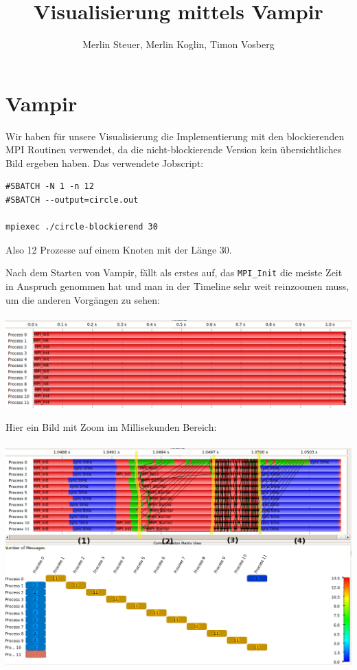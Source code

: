 \documentclass[11pt]{article} %
\title{Visualisierung mittels Vampir}
\author{Merlin Steuer, Merlin Koglin, Timon Vosberg}
\date{} %
\begin{document}
\maketitle
\section{Vampir}
Wir haben für unsere Visualisierung die Implementierung mit den blockierenden MPI Routinen verwendet, da die nicht-blockierende Version kein übersichtliches Bild ergeben haben.
Das verwendete Jobscript:
\begin{verbatim}
#SBATCH -N 1 -n 12
#SBATCH --output=circle.out

mpiexec ./circle-blockierend 30
\end{verbatim}
Also 12 Prozesse auf einem Knoten mit der Länge 30.

Nach dem Starten von Vampir, fällt als erstes auf, das \verb|MPI_Init| die meiste Zeit in Anspruch genommen hat und man in der Timeline sehr weit reinzoomen muss,
um die anderen Vorgängen zu sehen:\\
~\\
\includegraphics[width=1\textwidth]{./vampir/start.png}

\newpage
Hier ein Bild mit Zoom im Millisekunden Bereich:\\
~\\
\includegraphics[width=1\textwidth]{./vampir/phasen_numnachrichten.png}
\end{document}
